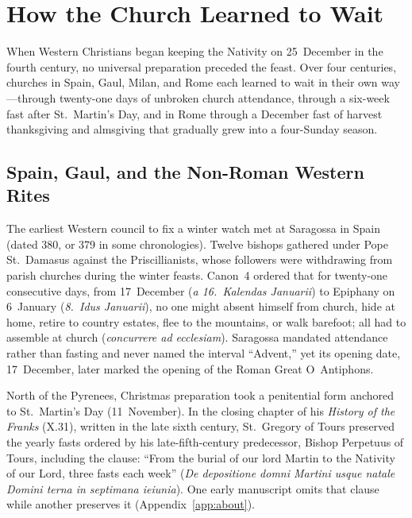 \section{How the Church Learned to Wait}\label{sec:history}

When Western Christians began keeping the Nativity on 25~December in the
fourth century, no universal preparation preceded the feast. Over four
centuries, churches in Spain, Gaul, Milan, and Rome each learned to wait in
their own way---through twenty-one days of unbroken church attendance,
through a six-week fast after St.~Martin's Day, and in Rome through a
December fast of harvest thanksgiving and almsgiving that gradually grew
into a four-Sunday season.

\subsection{Spain, Gaul, and the Non-Roman Western Rites}

The earliest Western council to fix a winter watch met at Saragossa in
Spain (dated 380, or 379 in some chronologies). Twelve bishops gathered
under Pope St.~Damasus against the Priscillianists, whose followers were
withdrawing from parish churches during the winter feasts. Canon~4 ordered
that for twenty-one consecutive days, from 17~December (\textit{a 16.\
Kalendas Januarii}) to Epiphany on 6~January (\textit{8.\ Idus Januarii}),
no one might absent himself from church, hide at home, retire to country
estates, flee to the mountains, or walk barefoot; all had to assemble at
church (\textit{concurrere ad ecclesiam}). Saragossa mandated attendance
rather than fasting and never named the interval ``Advent,'' yet its
opening date, 17~December, later marked the opening of the Roman Great
O~Antiphons.

North of the Pyrenees, Christmas preparation took a penitential form
anchored to St.~Martin's Day (11~November). In the closing chapter of his
\textit{History of the Franks} (X.31), written in the late sixth century,
St.~Gregory of Tours preserved the yearly fasts ordered by his
late-fifth-century predecessor, Bishop Perpetuus of Tours, including the
clause: ``From the burial of our lord Martin to the Nativity of our Lord,
three fasts each week'' (\textit{De depositione domni Martini usque natale
Domini terna in septimana ieiunia}). One early manuscript omits that
clause while another preserves it (Appendix~\ref{app:about}).

